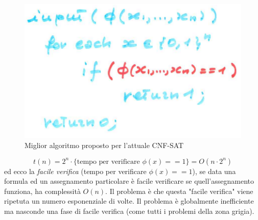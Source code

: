 \documentclass{article}
\begin{document}
\begin{figure}[H]
    \centering
    \includegraphics[scale=0.5]{images/cnf.png}
    \caption{Miglior algoritmo proposto per l'attuale CNF-SAT}
\end{figure}
$$t(n)=2^n\cdot \{\text{tempo per verificare }\phi(x)==1\} = O(n\cdot 2^n)$$
ed ecco la \textit{facile verifica} (tempo per verificare $\phi (x)==1$), se data una formula ed un assegnamento particolare
è facile verificare se quell'assegnamento funziona, ha complessità $O(n)$. Il problema
è che questa "facile verifica" viene ripetuta un numero esponenziale di volte. Il problema
è globalmente inefficiente ma nasconde una fase di facile verifica (come tutti i problemi
della zona grigia).
\end{document}
